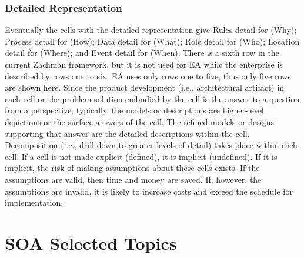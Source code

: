 \documentclass[12pt,a4paper,final,twoside,onecolumn,titlepage]{book}
\begin{document}
\subsubsection{Detailed Representation}
Eventually the cells with the detailed representation give Rules detail for (Why); Process detail for (How); Data detail for (What); Role detail for (Who); Location detail for (Where); and Event detail for (When).
There is a sixth row in the current Zachman framework, but it is not used for \gls{EA} while the enterprise is described by rows one to six, \gls{EA} uses only rows one to five, thus only five rows are shown here.
Since the product development (i.e., architectural artifact) in each cell or the problem solution embodied by the cell is the answer to a question from a perspective, typically, the models or descriptions are higher-level depictions or the surface answers of the cell. The refined models or designs supporting that answer are the detailed descriptions within the cell. Decomposition (i.e., drill down to greater levels of detail) takes place within each cell. If a cell is not made explicit (defined), it is implicit (undefined). If it is implicit, the risk of making assumptions about these cells exists. If the assumptions are valid, then time and money are saved. If, however, the assumptions are invalid, it is likely to increase costs and exceed the schedule for implementation.

\section{SOA Selected Topics}
\end{document}
